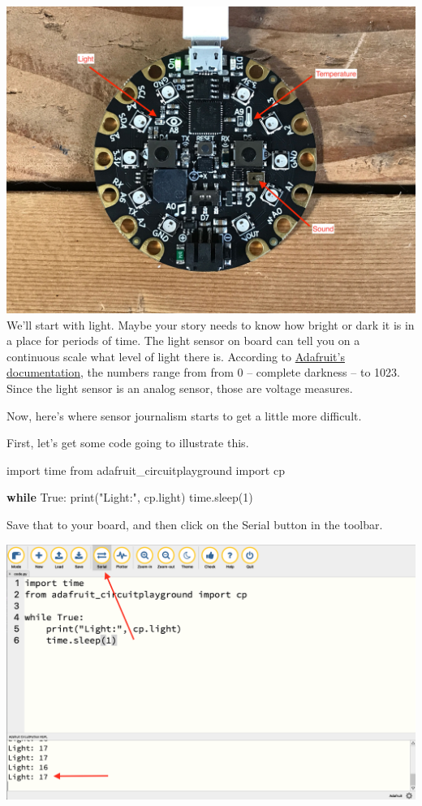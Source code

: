 \documentclass[
]{book}
\newenvironment{Shaded}{\begin{snugshade}}{\end{snugshade}}
\newcommand{\BuiltInTok}[1]{#1}
\newcommand{\ControlFlowTok}[1]{\textcolor[rgb]{0.13,0.29,0.53}{\textbf{#1}}}
\newcommand{\DecValTok}[1]{\textcolor[rgb]{0.00,0.00,0.81}{#1}}
\newcommand{\ImportTok}[1]{#1}
\newcommand{\NormalTok}[1]{#1}
\newcommand{\StringTok}[1]{\textcolor[rgb]{0.31,0.60,0.02}{#1}}
\newcommand{\VariableTok}[1]{\textcolor[rgb]{0.00,0.00,0.00}{#1}}
\begin{document}
\includegraphics[width=1\linewidth]{images/04image1}
We'll start with light. Maybe your story needs to know how bright or dark it is in a place for periods of time. The light sensor on board can tell you on a continuous scale what level of light there is. According to \href{https://cdn-learn.adafruit.com/downloads/pdf/adafruit-circuit-playground-express.pdf}{Adafruit's documentation}, the numbers range from from 0 -- complete darkness -- to 1023. Since the light sensor is an analog sensor, those are voltage measures.

Now, here's where sensor journalism starts to get a little more difficult.

First, let's get some code going to illustrate this.

\begin{Shaded}
\begin{Highlighting}[]
\ImportTok{import}\NormalTok{ time}
\ImportTok{from}\NormalTok{ adafruit_circuitplayground }\ImportTok{import}\NormalTok{ cp}
 
\ControlFlowTok{while} \VariableTok{True}\NormalTok{:}
    \BuiltInTok{print}\NormalTok{(}\StringTok{"Light:"}\NormalTok{, cp.light)}
\NormalTok{    time.sleep(}\DecValTok{1}\NormalTok{)}
\end{Highlighting}
\end{Shaded}

Save that to your board, and then click on the Serial button in the toolbar.

\includegraphics[width=1\linewidth]{images/04image2}
\end{document}
